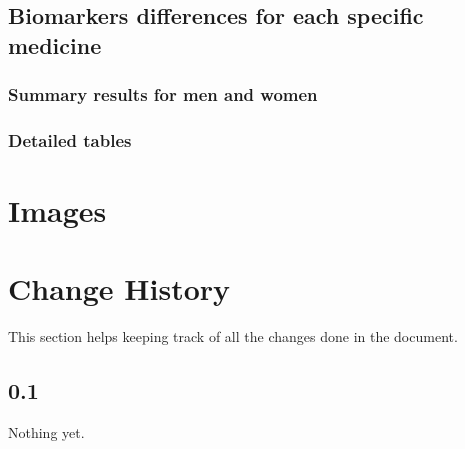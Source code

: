\documentclass[10pt, a4paper, onecolumn]{article} %
\begin{document}
\subsection{Biomarkers differences for each specific medicine}

\subsubsection{Summary results for men and women}





\subsubsection{Detailed tables}












\newpage


\section{Images}

\newpage

\section{Change History}

This section helps keeping track of all the changes done in the document.\\

\subsection*{0.1}

Nothing yet.\\
\end{document}
